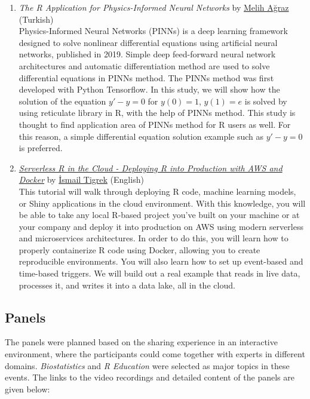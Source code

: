 \begin{enumerate}
    \item \textit{The R Application for Physics-Informed Neural Networks} by \href{https://www.linkedin.com/in/melih-agraz-5a45b737/}{Melih Ağraz} (Turkish)\\ Physics-Informed Neural Networks (PINNs) is a deep learning framework designed to solve nonlinear differential equations using artificial neural networks, published in 2019. Simple deep feed-forward neural network architectures and automatic differentiation method are used to solve differential equations in PINNs method. The PINNs method was first developed with Python Tensorflow. In this study, we will show how the solution of the equation $y'-y=0$ for $y(0)=1$, $y(1)=e$ is solved by using reticulate \citep{reticulate} library in R, with the help of PINNs method. This study is thought to find application area of PINNs method for R users as well. For this reason, a simple differential equation solution example such as $y' - y = 0$ is preferred.\\
    
    \item \textit{\href{https://www.youtube.com/watch?v=dgkm0QkWXag}{Serverless R in the Cloud - Deploying R into Production with AWS and Docker}} by \href{https://www.linkedin.com/in/ismailtigrek/}{İsmail Tigrek} (English)\\ This tutorial will walk through deploying R code, machine learning models, or Shiny applications in the cloud environment. With this knowledge, you will be able to take any local R-based project you’ve built on your machine or at your company and deploy it into production on AWS using modern serverless and microservices architectures. In order to do this, you will learn how to properly containerize R code using Docker, allowing you to create reproducible environments. You will also learn how to set up event-based and time-based triggers. We will build out a real example that reads in live data, processes it, and writes it into a data lake, all in the cloud.
\end{enumerate}
\newpage
\subsection{Panels}

The panels were planned based on the sharing experience in an interactive environment, where the participants could come together with experts in different domains. \textit{Biostatistics} and \textit{R Education} were selected as major topics in these events. The links to the video recordings and detailed content of the panels are given below:  

